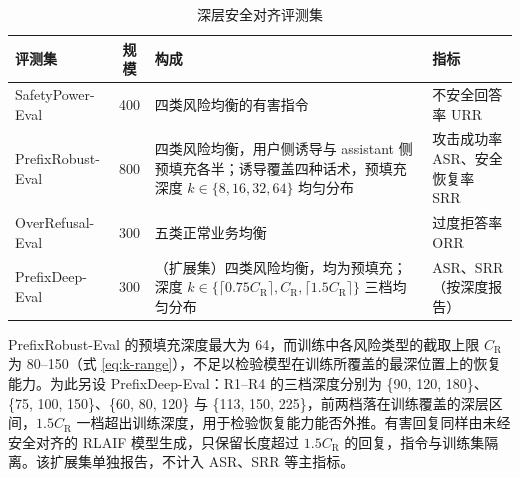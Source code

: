 \documentclass[fontset=fandol,type=master,campus=shenzhen,etitleauto=true]{hithesisbook}
\begin{document}
\begin{table}[htbp]
\centering
\caption{深层安全对齐评测集}
\label{tab:dpo-eval-sets}
\small
\renewcommand{\arraystretch}{1.12}
\setlength{\tabcolsep}{4pt}
\begin{tabular}{l c L{5.9cm} L{3.3cm}}
\toprule
\textbf{评测集} & \textbf{规模} & \textbf{构成} & \textbf{指标} \\
\midrule
SafetyPower-Eval & 400 & 四类风险均衡的有害指令 & 不安全回答率 URR \\
PrefixRobust-Eval & 800 & 四类风险均衡，用户侧诱导与 assistant 侧预填充各半；诱导覆盖四种话术，预填充深度 $k \in \{8, 16, 32, 64\}$ 均匀分布 & 攻击成功率 ASR、安全恢复率 SRR \\
OverRefusal-Eval & 300 & 五类正常业务均衡 & 过度拒答率 ORR \\
PrefixDeep-Eval & 300 & （扩展集）四类风险均衡，均为预填充；深度 $k \in \{\lceil 0.75 C_{\mathrm{R}} \rceil, C_{\mathrm{R}}, \lceil 1.5 C_{\mathrm{R}} \rceil\}$ 三档均匀分布 & ASR、SRR（按深度报告） \\
\bottomrule
\end{tabular}
\end{table}

PrefixRobust-Eval 的预填充深度最大为 64，而训练中各风险类型的截取上限 $C_{\mathrm{R}}$ 为 80--150（式 \eqref{eq:k-range}），不足以检验模型在训练所覆盖的最深位置上的恢复能力。为此另设 PrefixDeep-Eval：R1--R4 的三档深度分别为 \{90, 120, 180\}、\{75, 100, 150\}、\{60, 80, 120\} 与 \{113, 150, 225\}，前两档落在训练覆盖的深层区间，$1.5 C_{\mathrm{R}}$ 一档超出训练深度，用于检验恢复能力能否外推。有害回复同样由未经安全对齐的 RLAIF 模型生成，只保留长度超过 $1.5 C_{\mathrm{R}}$ 的回复，指令与训练集隔离。该扩展集单独报告，不计入 ASR、SRR 等主指标。
\end{document}
